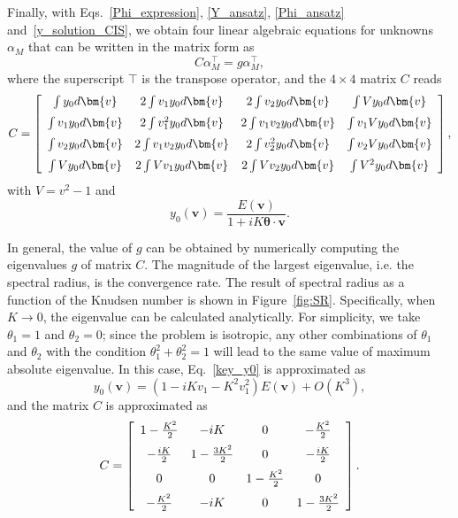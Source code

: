 Finally, with Eqs.~\eqref{Phi_expression}, \eqref{Y_ansatz}, \eqref{Phi_ansatz} and~\eqref{y_solution_CIS}, we obtain four linear algebraic equations for unknowns $\alpha_M$ that can be written in the matrix form as
\begin{equation}
C\alpha_M^\top={g}\alpha_M^\top,
\end{equation} 
where the superscript $\top$ is the transpose operator, and the $4\times4$ matrix $C$ reads
\begin{equation}\label{CIS}
C=\left[ \begin {array}{cccccc} 
\int{y_0d\bm{v}} & 2\int{v_1y_0d\bm{v}}& 2\int{v_2y_0d\bm{v}} & \int{Vy_0d\bm{v}} 
\\ \noalign{\medskip}
\int{v_1y_0d\bm{v}} & 2\int{v_1^2y_0d\bm{v}}& 2\int{v_1v_2y_0d\bm{v}} & \int{v_1Vy_0d\bm{v}}
\\ \noalign{\medskip}
\int{v_2y_0d\bm{v}} & 2\int{v_1v_2y_0d\bm{v}}& 2\int{v_2^2y_0d\bm{v}} & \int{v_2Vy_0d\bm{v}}
\\ \noalign{\medskip}
\int{Vy_0d\bm{v}} & 2\int{Vv_1y_0d\bm{v}}& 2\int{Vv_2y_0d\bm{v}} & \int{V^2y_0d\bm{v}} 
\end {array} \right], 
\end{equation}
with $V=v^2-1$ and
\begin{equation}\label{key_y0}
y_0(\bm{v})=\frac{E(\bm{v})}{1+iK\bm{\theta}\cdot\bm{v}}.
\end{equation}


In general, the value of ${g}$ can be obtained by numerically computing the eigenvalues ${g}$ of matrix $C$. The magnitude of the largest eigenvalue, i.e. the spectral radius, is the convergence rate. The result of spectral radius as a function of the Knudsen number is shown in Figure~\ref{fig:SR}. Specifically, when $K\rightarrow0$, the eigenvalue can be calculated analytically. For simplicity, we take $\theta_1=1$ and $\theta_2=0$; since the problem is isotropic, any other combinations of $\theta_1$ and $\theta_2$ with the condition $\theta_1^2+\theta_2^2=1$ will lead to the same value of maximum absolute eigenvalue. In this case, Eq.~\eqref{key_y0} is approximated as
\begin{equation}
y_0(\bm{v})=(1-iKv_1-K^2v_1^2)E(\bm{v})+O(K^3),
\end{equation}
and the matrix $C$ is approximated as
\begin{equation}\label{CIS_taylor}
C=\left[ \begin {array}{cccccc} 
1-\frac{K^2}{2} & -iK & 0 & -\frac{K^2}{2}
\\ \noalign{\medskip}
-\frac{iK}{2} & 1-\frac{3K^2}{2}& 0 & -\frac{iK}{2}
\\ \noalign{\medskip}
0 & 0 & 1-\frac{K^2}{2} & 0
\\ \noalign{\medskip}
-\frac{K^2}{2} & -iK & 0 & 1-\frac{3K^2}{2}
\end {array} \right].
\end{equation}

